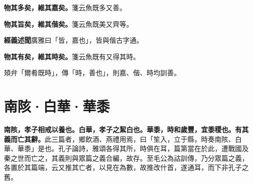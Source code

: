 \textbf{物其多矣，維其嘉矣。}{\footnotesize 箋云魚既多又善。}

\textbf{物其旨矣，維其偕矣。}{\footnotesize 箋云魚既美又齊等。}

\begin{quoting}\textbf{經義述聞}廣雅曰「皆，嘉也」，皆與偕古字通。\end{quoting}

\textbf{物其有矣，維其時矣。}{\footnotesize 箋云魚既有又得其時。}

\begin{quoting}頍弁「爾肴既時」，傳「時，善也」，則嘉、偕、時均訓善。\end{quoting}

\section*{南陔·白華·華黍}

\textbf{南陔，孝子相戒以養也。白華，孝子之絜白也。華黍，時和歲豐，宜黍稷也。有其義而亡其辭。}{\footnotesize 此三篇者，鄉飲酒、燕禮用焉，曰「笙入，立于縣，時奏南陔、白華、華黍」是也。孔子論詩，雅頌各得其所，時俱在耳，篇第當在於此，遭戰國及秦之世而亡之，其義則與眾篇之義合編，故存。至毛公為詁訓傳，乃分眾篇之義，各置於其篇端，云又推其亡者，以見在為數，故推改什首，遂通耳，而下非孔子之舊。}

